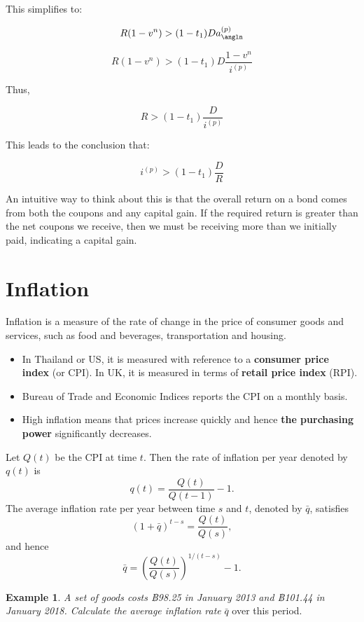 \documentclass[
]{book}
\theoremstyle{definition}
\theoremstyle{definition}
\newtheorem{example}{Example}[chapter]
\theoremstyle{definition}
\theoremstyle{definition}
\theoremstyle{remark}
\begin{document}
This simplifies to:

\[
R(1 - v^n) > (1 - t_1) D a_{\angln}^{(p)} 
\]

\[
R(1 - v^n) > (1 - t_1) D \frac{1 - v^n }{i^{(p)}} 
\]

Thus,

\[
R > (1 - t_1) \frac{D }{i^{(p)}} 
\]

This leads to the conclusion that:

\[
i^{(p)} > (1 - t_1) \frac{D}{R} 
\]

An intuitive way to think about this is that the overall return on a bond comes from both the coupons and any capital gain. If the required return is greater than the net coupons we receive, then we must be receiving more than we initially paid, indicating a capital gain.

\section{Inflation}\label{inflation}

Inflation is a measure of the rate of change in the price of consumer
goods and services, such as food and beverages, transportation and
housing.

\begin{itemize}
\item
  In Thailand or US, it is measured with reference to a \textbf{consumer
  price index} (or CPI). In UK, it is measured in terms of \textbf{retail
  price index} (RPI).
\item
  Bureau of Trade and Economic Indices reports the CPI on a monthly
  basis.
\item
  High inflation means that prices increase quickly and hence \textbf{the
  purchasing power} significantly decreases.
\end{itemize}

Let \(Q(t)\) be the CPI at time \(t\). Then the rate of inflation per year
denoted by \(q(t)\) is \[q(t) = \frac{Q(t)}{Q(t-1)} - 1.\] The average
inflation rate per year between time \(s\) and \(t\), denoted by \(\bar{q}\),
satisfies \[(1 + \bar{q})^{t-s} = \frac{Q(t)}{Q(s)},\] and hence
\[\bar{q} = \left( \frac{Q(t)}{Q(s)}  \right)^{1/(t-s)} - 1.\]

\begin{example}
\emph{A set of goods costs ฿98.25 in January 2013 and ฿101.44 in January
2018. Calculate the average inflation rate} \(\bar{q}\) over this period.
\end{example}
\end{document}

